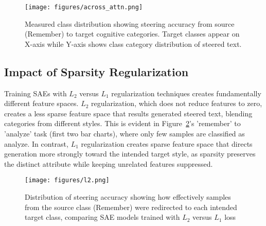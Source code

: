 \begin{figure}[!ht]
\centering
  \texttt{[image: figures/across\_attn.png]}
  \caption{ Measured class distribution showing steering accuracy from source (Remember) to target cognitive categories. Target classes appear on X-axis while Y-axis shows class category distribution of steered text. }
  \label{fig:across_attn}
\end{figure}










\subsection{Impact of Sparsity Regularization}
Training SAEs with $L_{2}$ versus $L_{1}$ regularization techniques creates fundamentally different feature spaces. $L_{2}$ regularization, which does not reduce features to zero, creates a less sparse feature space that results generated steered text, blending categories from different styles. This is evident in Figure~\ref{fig:l2vl1}'s 'remember' to 'analyze' task (first two bar charts), where only few samples are classified as analyze. In contrast, $L_{1}$ regularization creates sparse feature space that directs generation more strongly toward the intended target style, as sparsity preserves the distinct attribute while keeping unrelated features suppressed.
\begin{figure}[!ht]
\centering
\texttt{[image: figures/l2.png]}
\caption{Distribution of steering accuracy showing how effectively samples from the source class (Remember) were redirected to each intended target class, comparing SAE models trained with $L_{2}$ versus $L_{1}$ loss}
\label{fig:l2vl1}
\end{figure}






